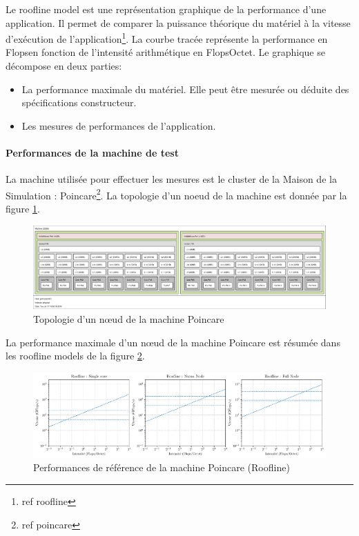 Le roofline model est une représentation graphique de la performance d'une application. Il permet de comparer la puissance théorique du matériel à la vitesse d'exécution de l'application\footnote{ref roofline}. La courbe tracée représente la performance en Flops\per\second en fonction de l'intensité arithmétique en Flops\per Octet. Le graphique se décompose en deux parties:
\begin{itemize}
	\item La performance maximale du matériel. Elle peut être mesurée ou déduite des spécifications constructeur.
	\item Les mesures de performances de l'application.
\end{itemize}

\paragraph{Performances de la machine de test}

La machine utilisée pour effectuer les mesures est le cluster de la Maison de la Simulation : Poincare\footnote{ref poincare}. La topologie d'un noeud de la machine est donnée par la figure \ref{fig:lstopo_poincare}.

\begin{figure}
	\centering
	\includegraphics[width=\textwidth]{img/lstopo_poincare}
	\caption{Topologie d'un nœud de la machine Poincare}
	\label{fig:lstopo_poincare}
\end{figure}

La performance maximale d'un nœud de la machine Poincare est résumée dans les roofline models de la figure \ref{fig:roofline_poincare}. 

\begin{figure}
	\includegraphics[width=\textwidth]{img/bench_mesh_roofline_limits}
	\caption{Performances de référence de la machine Poincare (Roofline)}
	\label{fig:roofline_poincare}
\end{figure}

